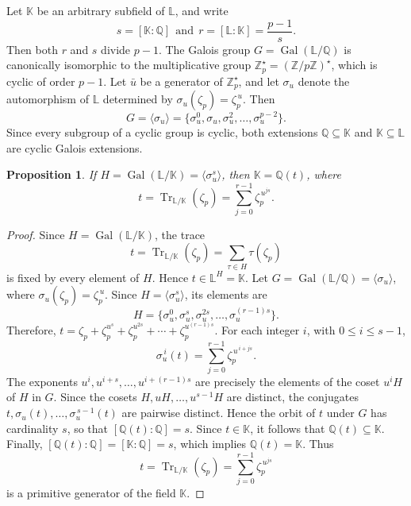 \documentclass{amsart}
\newtheorem{proposition}[theorem]{Proposition}
\begin{document}
Let $\mathbb{K}$ be an arbitrary subfield of $\mathbb{L}$, and write \[ s=[\mathbb{K}:\mathbb{Q}] \ \ \mbox{and} \ \ r=[\mathbb{L}:\mathbb{K}]=\frac{p-1}{s}. \] Then both $r$ and $s$ divide $p-1$. The Galois group
$G=\operatorname{Gal}(\mathbb{L}/\mathbb{Q})$ is canonically isomorphic to the multiplicative group $\mathbb{Z}_p^{\star} =(\mathbb{Z}/p\mathbb{Z})^{\star}$,
which is cyclic of order $p-1$. Let $\bar{u}$ be a generator of $\mathbb{Z}_p^{\star}$, and let $\sigma_u$ denote the automorphism of $\mathbb{L}$ determined by $\sigma_u(\zeta_p)=\zeta_p^{\,u}$.
Then \[ G=\langle\sigma_u\rangle = \{\sigma_u^0,\sigma_u,\sigma_u^2,\ldots,\sigma_u^{p-2}\}. \] Since every subgroup of a cyclic group is cyclic, both extensions $\mathbb{Q}\subseteq\mathbb{K}$ and $\mathbb{K}\subseteq\mathbb{L}$ are cyclic Galois extensions.

\begin{proposition} If $H=\operatorname{Gal}(\mathbb{L}/\mathbb{K}) = \langle \sigma_{u}^s\rangle$, then $\mathbb{K}=\mathbb{Q}(t)$, where
\[ t = \operatorname{Tr}_{\mathbb{L}/\mathbb{K}}(\zeta_p) = \sum_{j=0}^{r-1}\zeta_p^{\,u^{js}}. \]
\end{proposition}
\begin{proof} Since $H=\operatorname{Gal}(\mathbb{L}/\mathbb{K})$, the trace \[ t = \operatorname{Tr}_{\mathbb{L}/\mathbb{K}}(\zeta_p) = \sum_{\tau\in H}\tau(\zeta_p) \]
is fixed by every element of $H$. Hence $t\in\mathbb{L}^H=\mathbb{K}$. Let $ G=\operatorname{Gal}(\mathbb{L}/\mathbb{Q}) = \langle\sigma_u\rangle$, where $\sigma_u(\zeta_p)=\zeta_p^{\,u}$. Since
$H=\langle\sigma_{u}^s\rangle$,  its elements are \[ H = \{\sigma_u^0,\sigma_{u}^s,\sigma_{u}^{2s},\ldots,\sigma_{u}^{(r-1)s}\}. \] Therefore, $t = \zeta_p+\zeta_p^{u^s}
+\zeta_p^{u^{2s}} +\cdots+\zeta_p^{u^{(r-1)s}}$. For each integer $i$, with $0\le i\le s-1$, \[ \sigma_u^{\,i}(t) = \sum_{j=0}^{r-1} \zeta_p^{\,u^{\,i+js}}. \]
The exponents $u^{i},u^{i+s},\ldots,u^{i+(r-1)s}$ are precisely the elements of the coset $u^{i}H$ of $H$ in $G$. Since the cosets $H,uH,\ldots,u^{s-1}H$ are distinct, the conjugates
$t,\sigma_u(t),\ldots,\sigma_u^{\,s-1}(t)$ are pairwise distinct. Hence the orbit of $t$ under $G$ has cardinality $s$, so that
$[\mathbb{Q}(t):\mathbb{Q}] =s$. Since $t\in\mathbb{K}$, it follows that $\mathbb{Q}(t)\subseteq\mathbb{K}$. Finally, $
[\mathbb{Q}(t):\mathbb{Q}] = [\mathbb{K}:\mathbb{Q}] = s$, which implies $\mathbb{Q}(t)=\mathbb{K}$. Thus 
\[ t = \operatorname{Tr}_{\mathbb{L}/\mathbb{K}}(\zeta_p) = \sum_{j=0}^{r-1}\zeta_p^{\,u^{js}} \] is a primitive generator of the field $\mathbb{K}$.
\end{proof}
\end{document}
